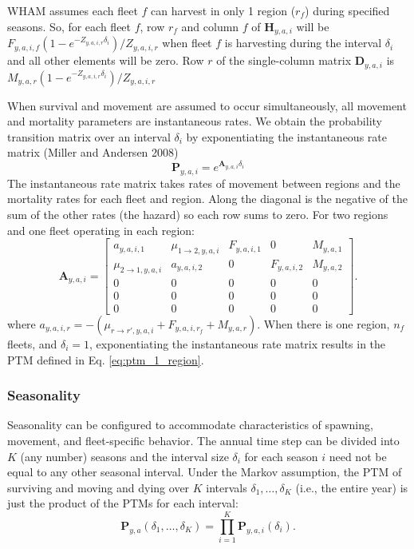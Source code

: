 \documentclass[
]{article}
\begin{document}
WHAM assumes each fleet \(f\) can harvest in only 1 region (\(r_f\))
during specified seasons. So, for each fleet \(f\), row \(r_f\) and
column \(f\) of \(\mathbf{H}_{y,a,i}\) will be
\(F_{y,a,i,f}\left(1 - e^{-Z_{y,a,i,r}\delta_i}\right)/Z_{y,a,i,r}\)
when fleet \(f\) is harvesting during the interval \(\delta_i\) and all
other elements will be zero. Row \(r\) of the single-column matrix
\(\mathbf{D}_{y,a,i}\) is
\(M_{y,a,r}\left(1 - e^{-Z_{y,a,i,r}\delta_i}\right)/Z_{y,a,i,r}\)

When survival and movement are assumed to occur simultaneously, all
movement and mortality parameters are instantaneous rates. We obtain the
probability transition matrix over an interval \(\delta_i\) by
exponentiating the instantaneous rate matrix (Miller and Andersen 2008)
\begin{equation*}
\mathbf{P}_{y,a,i} = e^{\mathbf{A}_{y,a,i}\delta_i}
\end{equation*} The instantaneous rate matrix takes rates of movement
between regions and the mortality rates for each fleet and region. Along
the diagonal is the negative of the sum of the other rates (the hazard)
so each row sums to zero. For two regions and one fleet operating in
each region: \begin{equation*}
 \mathbf{A}_{y,a,i} = \begin{bmatrix}
 a_{y,a,i,1} & \mu_{1\rightarrow 2,y,a,i} & F_{y,a,i,1} & 0 & M_{y,a,1} \\
 \mu_{2\rightarrow 1,y,a,i} &  a_{y,a,i,2} & 0 & F_{y,a,i,2} & M_{y,a,2} \\
 0 & 0 & 0 & 0 & 0 \\
 0 & 0 & 0 & 0 & 0 \\
 0 & 0 & 0 & 0 & 0
 \end{bmatrix}.
\end{equation*} where
\(a_{y,a,i,r} = -(\mu_{r\rightarrow r',y,a,i} + F_{y,a,i,r_f} + M_{y,a,r})\).
When there is one region, \(n_f\) fleets, and \(\delta_i = 1\),
exponentiating the instantaneous rate matrix results in the PTM defined
in Eq. \ref{eq:ptm_1_region}.

\hypertarget{seasonality}{%
\subsubsection*{Seasonality}\label{seasonality}}

Seasonality can be configured to accommodate characteristics of
spawning, movement, and fleet-specific behavior. The annual time step
can be divided into \(K\) (any number) seasons and the interval size
\(\delta_i\) for each season \(i\) need not be equal to any other
seasonal interval. Under the Markov assumption, the PTM of surviving and
moving and dying over \(K\) intervals \(\delta_1,\ldots, \delta_K\)
(i.e., the entire year) is just the product of the PTMs for each
interval:
\[ \mathbf{P}_{y,a}(\delta_1,\ldots,\delta_K) = \prod^K_{i=1}\mathbf{P}_{y,a,i}(\delta_i).\]
\end{document}
